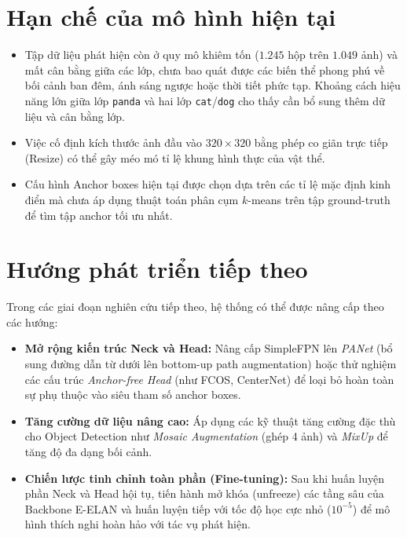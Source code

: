 \documentclass[fontsize=13pt,a4paper,oneside,DIV=calc,chapterprefix=true]{scrbook}
\begin{document}
\section{Hạn chế của mô hình hiện tại}
\begin{itemize}[leftmargin=1.2cm]
    \item Tập dữ liệu phát hiện còn ở quy mô khiêm tốn ($1.245$ hộp trên $1.049$ ảnh) và mất cân bằng giữa các lớp, chưa bao quát được các biến thể phong phú về bối cảnh ban đêm, ánh sáng ngược hoặc thời tiết phức tạp. Khoảng cách hiệu năng lớn giữa lớp \texttt{panda} và hai lớp \texttt{cat}/\texttt{dog} cho thấy cần bổ sung thêm dữ liệu và cân bằng lớp.
    \item Việc cố định kích thước ảnh đầu vào $320 \times 320$ bằng phép co giãn trực tiếp (Resize) có thể gây méo mó tỉ lệ khung hình thực của vật thể.
    \item Cấu hình Anchor boxes hiện tại được chọn dựa trên các tỉ lệ mặc định kinh điển mà chưa áp dụng thuật toán phân cụm $k$-means trên tập ground-truth để tìm tập anchor tối ưu nhất.
\end{itemize}

\section{Hướng phát triển tiếp theo}
Trong các giai đoạn nghiên cứu tiếp theo, hệ thống có thể được nâng cấp theo các hướng:
\begin{itemize}[leftmargin=1.2cm]
    \item \textbf{Mở rộng kiến trúc Neck và Head:} Nâng cấp SimpleFPN lên \textit{PANet} (bổ sung đường dẫn từ dưới lên bottom-up path augmentation) hoặc thử nghiệm các cấu trúc \textit{Anchor-free Head} (như FCOS, CenterNet) để loại bỏ hoàn toàn sự phụ thuộc vào siêu tham số anchor boxes.
    \item \textbf{Tăng cường dữ liệu nâng cao:} Áp dụng các kỹ thuật tăng cường đặc thù cho Object Detection như \textit{Mosaic Augmentation} (ghép 4 ảnh) và \textit{MixUp} để tăng độ đa dạng bối cảnh.
    \item \textbf{Chiến lược tinh chỉnh toàn phần (Fine-tuning):} Sau khi huấn luyện phần Neck và Head hội tụ, tiến hành mở khóa (unfreeze) các tầng sâu của Backbone E-ELAN và huấn luyện tiếp với tốc độ học cực nhỏ ($10^{-5}$) để mô hình thích nghi hoàn hảo với tác vụ phát hiện.
\end{itemize}
\end{document}
